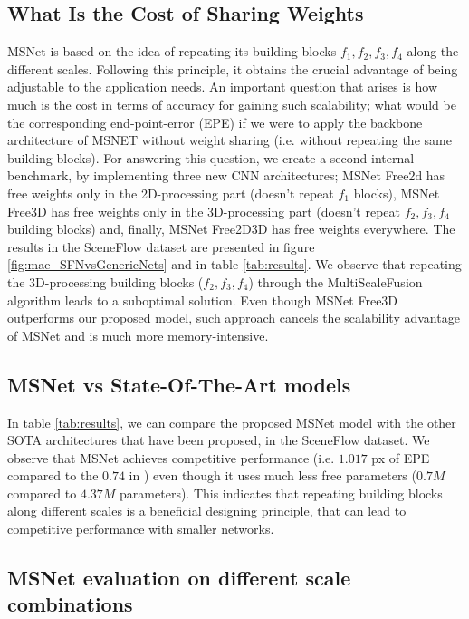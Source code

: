 \documentclass[runningheads]{llncs}
\begin{document}
\subsection{What Is the Cost of Sharing Weights}

MSNet is based on the idea of repeating its building blocks $f_1, f_2, f_3, f_4$ along the different scales. Following this principle, it obtains the crucial advantage of being adjustable to the application needs. An important question that arises is how much is the cost in terms of accuracy for gaining such scalability; what would be the corresponding end-point-error (EPE) if we were to apply the backbone architecture of MSNET without weight sharing (i.e. without repeating the same building blocks). For answering this question, we create a second internal benchmark, by implementing three new CNN architectures; MSNet Free2d has free weights only in the 2D-processing part (doesn't repeat $f_1$ blocks), MSNet Free3D has free weights only in the 3D-processing part (doesn't repeat $f_2, f_3, f_4$ building blocks) and, finally, MSNet Free2D3D has free weights everywhere. The results in the SceneFlow dataset are presented in figure \ref{fig:mae_SFNvsGenericNets} and in table \ref{tab:results}. We observe that repeating the 3D-processing building blocks ($f_2, f_3, f_4$) through the MultiScaleFusion algorithm leads to a suboptimal solution. Even though MSNet Free3D outperforms our proposed model, such approach cancels the scalability advantage of MSNet and is much more memory-intensive.

\subsection{MSNet vs State-Of-The-Art models}

In table \ref{tab:results}, we can compare the proposed MSNet model with the other SOTA architectures that have been proposed, in the SceneFlow dataset. We observe that MSNet achieves competitive performance (i.e. $1.017$ px of EPE compared to the $0.74$ in \cite{du2019amnet}) even though it uses much less free parameters ($0.7M$ compared to $4.37M$ parameters). This indicates that repeating building blocks along different scales is a beneficial designing principle, that can lead to competitive performance with smaller networks.  

\subsection{MSNet evaluation on different scale combinations}
\end{document}
